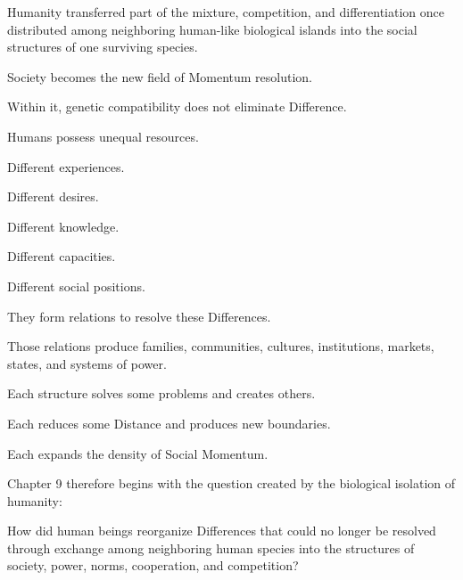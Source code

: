 Humanity transferred part of the mixture, competition, and differentiation once distributed among neighboring human-like biological islands into the social structures of one surviving species.

Society becomes the new field of Momentum resolution.

Within it, genetic compatibility does not eliminate Difference.

Humans possess unequal resources.

Different experiences.

Different desires.

Different knowledge.

Different capacities.

Different social positions.

They form relations to resolve these Differences.

Those relations produce families, communities, cultures, institutions, markets, states, and systems of power.

Each structure solves some problems and creates others.

Each reduces some Distance and produces new boundaries.

Each expands the density of Social Momentum.

Chapter 9 therefore begins with the question created by the biological isolation of humanity:

How did human beings reorganize Differences that could no longer be resolved through exchange among neighboring human species into the structures of society, power, norms, cooperation, and competition?